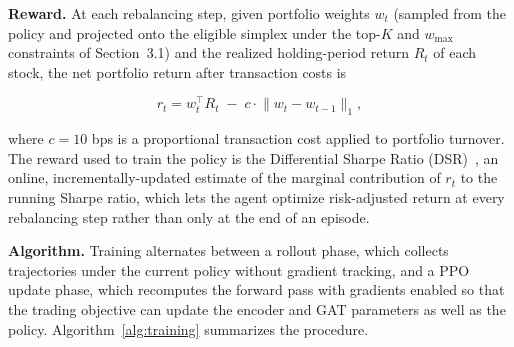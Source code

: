 \documentclass[runningheads]{llncs}
\begin{document}
\textbf{Reward.} At each rebalancing step, given portfolio weights $w_t$ (sampled from the policy and projected onto the eligible simplex under the top-$K$ and $w_{\max}$ constraints of Section~3.1) and the realized holding-period return $R_t$ of each stock, the net portfolio return after transaction costs is

\[
r_t
=
w_t^{\top}R_t
\;-\;
c\cdot\lVert w_t-w_{t-1}\rVert_1,
\]

where $c=10$ bps is a proportional transaction cost applied to portfolio turnover. The reward used to train the policy is the Differential Sharpe Ratio (DSR)~\cite{moody2001saffell}, an online, incrementally-updated estimate of the marginal contribution of $r_t$ to the running Sharpe ratio, which lets the agent optimize risk-adjusted return at every rebalancing step rather than only at the end of an episode.

\textbf{Algorithm.} Training alternates between a rollout phase, which collects trajectories under the current policy without gradient tracking, and a PPO update phase, which recomputes the forward pass with gradients enabled so that the trading objective can update the encoder and GAT parameters as well as the policy. Algorithm~\ref{alg:training} summarizes the procedure.
\end{document}
